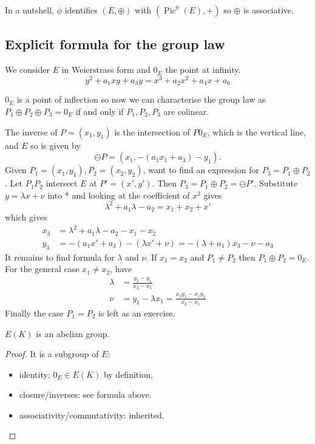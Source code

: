 \documentclass[a4paper]{article}
\theoremstyle{definition}
\DeclareMathOperator{\Pic}{Pic} %
\begin{document}
In a nutshell, \(\phi\) identifies \((E, \oplus)\) with \((\Pic^0(E), +)\) so \(\oplus\) is associative.

\subsection{Explicit formula for the group law}

We consider \(E\) in Weierstrass form and \(0_E\) the point at infinity.
\[
  y^2 + a_1xy + a_3 y = x^3 + a_2x^2 + a_4x + a_6
\]

\begin{remark}
  \(0_E\) is a point of inflection so now we can characterise the group law as \(P_1 \oplus P_2 \oplus P_3 = 0_E\) if and only if \(P_1, P_2, P_3\) are colinear.
\end{remark}

The inverse of \(P = (x_1, y_1)\) is the intersection of \(P0_E\), which is the vertical line, and \(E\) so is given by
\[
  \ominus P = (x_1, -(a_1x_1 + a_3) - y_1).
\]
Given \(P_1 = (x_1, y_1), P_2 = (x_2, y_2)\), want to find an expression for \(P_3 = P_1 \oplus P_2\). Let \(P_1P_2\) intersect \(E\) at \(P' = (x', y')\). Then \(P_3 = P_1 \oplus P_2 = \ominus P'\). Substitute \(y = \lambda x + \nu\) into * and looking at the coefficient of \(x^2\) gives
\[
  \lambda^2 + a_1 \lambda - a_2 = x_1 + x_2 + x'
\]
which gives
\begin{align*}
  x_3 &= \lambda^2 + a_1 \lambda - a_2 - x_1 - x_2 \\
  y_3 &= -(a_1x' + a_3) - (\lambda x' + \nu) = -(\lambda + a_1) x_3 - \nu - a_3
\end{align*}
It remains to find formula for \(\lambda\) and \(\nu\). If \(x_1 = x_2\) and \(P_1 \neq P_2\) then \(P_1 \oplus P_2 = 0_E\). For the general case \(x_1 \neq x_2\), have
\begin{align*}
  \lambda &= \frac{y_2 - y_1}{x_2 - x_1} \\
  \nu &= y_1 - \lambda x_1 = \frac{x_2y_1 - x_1 y_2}{x_2 - x_1}
\end{align*}
Finally the case \(P_1 = P_2\) is left as an exercise.

\begin{corollary}
  \(E(K)\) is an abelian group.
\end{corollary}

\begin{proof}
  It is a subgroup of \(E\):
  \begin{itemize}
  \item identity: \(0_E \in E(K)\) by definition,
  \item closure/inverses: see formula above.
  \item associativity/commutativity: inherited.
  \end{itemize}
\end{proof}
\end{document}
